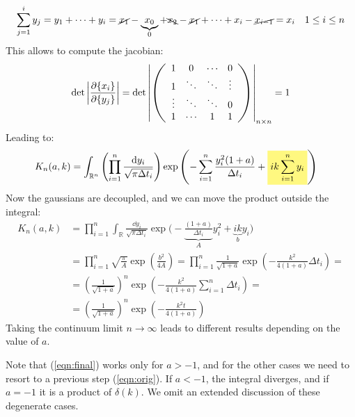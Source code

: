 \documentclass[../template.tex]{subfiles}
\begin{document}
\begin{exo}
\begin{align*}
        \sum_{j=1}^i y_j = y_1+\dots + y_i = \cancel{x_1}-\underbrace{x_0 }_{0}+ \bcancel{x_2}-\cancel{x_1 }+ \dots + x_i - \cancel{x_{i-1}} = x_i \quad 1 \leq i \leq n
    \end{align*}
    This allows to compute the jacobian:
    \begin{align*}
        \operatorname{det}\left|\pdv{\{x_i\}}{\{y_j\}} \right| = \operatorname{det} \left|\left(\begin{array}{cccc}
        1 & 0 & \cdots & 0 \\ 
        1 & \ddots & \ddots & \vdots \\ 
        \vdots & \ddots & \ddots & 0 \\ 
        1 & \cdots & 1 & 1
        \end{array}\right) \right|_{n\times n} = 1
    \end{align*}
    Leading to:
    \begin{align*}
        K_n(a,k) &= \int_{\mathbb{R}^n}  \left(\prod_{i=1}^n \frac{\dd{y_i}}{\sqrt{\pi \Delta t_i}} \right) \exp\left(-\sum_{i=1}^n \frac{y_i^2 (1+a)}{\Delta t_i}  + \hlc{Yellow}{ik \sum_{i=1}^n y_i}\right)
    \end{align*}
    Now the gaussians are decoupled, and we can move the product outside the integral:
    \begin{align}
        K_n(a,k) &= \prod_{i=1}^n \int_{\mathbb{R}} \frac{\dd{y_i}}{\sqrt{\pi \Delta t_i}} \exp\Bigg(-\underbrace{\frac{(1+a)}{\Delta t_i} }_{A}y_i^2 + \underbrace{ik}_{b}y_i \Bigg) \label{eqn:orig} \\ \nonumber
        &= \prod_{i=1}^n \sqrt{\frac{\pi}{A} } \exp\left(\frac{b^2}{4A} \right) = \prod_{i=1}^n \frac{1}{\sqrt{1+a}}  \exp\left(-\frac{k^2}{4(1+a)}\Delta t_i\right) =\\ \nonumber
        &= \left(\frac{1}{\sqrt{1+a}} \right)^n \exp\left(-\frac{k^2}{4(1+a) } \sum_{i=1}^n \Delta t_i \right) =\\ \label{eqn:final}
        &= \left(\frac{1}{\sqrt{1+a}} \right)^n \exp\left(-\frac{k^2 t}{4(1+a)} \right)
    \end{align}
    Taking the continuum limit $n \to \infty$ leads to different results depending on the value of $a$. 
    
    Note that (\ref{eqn:final}) works only for $a > -1$, and for the other cases we need to resort to a previous step (\ref{eqn:orig}). If $a < -1$, the integral diverges, and if $a = -1$ it is a product of $\delta(k)$. We omit an extended discussion of these degenerate cases.



\end{exo}
\end{document}
